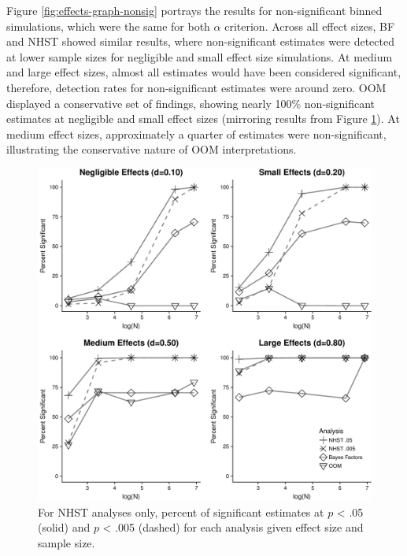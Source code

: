 \documentclass[english,man]{apa6}
\theoremstyle{definition}
\theoremstyle{definition}
\theoremstyle{definition}
\theoremstyle{remark}
\begin{document}
Figure \ref{fig:effects-graph-nonsig} portrays the results for
non-significant binned simulations, which were the same for both
\(\alpha\) criterion. Across all effect sizes, BF and NHST showed
similar results, where non-significant estimates were detected at lower
sample sizes for negligible and small effect size simulations. At medium
and large effect sizes, almost all estimates would have been considered
significant, therefore, detection rates for non-significant estimates
were around zero. OOM displayed a conservative set of findings, showing
nearly 100\% non-significant estimates at negligible and small effect
sizes (mirroring results from Figure \ref{fig:effects-graph-sig}). At
medium effect sizes, approximately a quarter of estimates were
non-significant, illustrating the conservative nature of OOM
interpretations.

\begin{figure}
\centering
\includegraphics{alt_nhst_FINAL_files/figure-latex/effects-graph-sig-1.pdf}
\caption{\label{fig:effects-graph-sig}For NHST analyses only, percent of
significant estimates at \(p\) \textless{} .05 (solid) and \(p\)
\textless{} .005 (dashed) for each analysis given effect size and sample
size.}
\end{figure}
\end{document}
